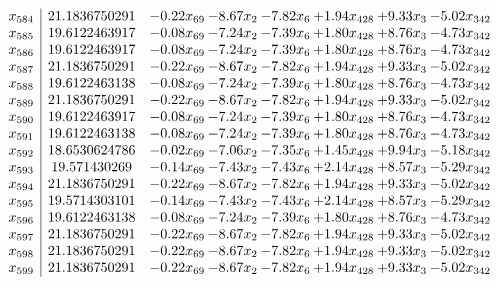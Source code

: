 \documentclass[8pt]{article}
\begin{document}
\[\begin{array}{c| c c@{\hskip 2pt} c@{\hskip 2pt} c@{\hskip 2pt} c@{\hskip 2pt} c@{\hskip 2pt} c@{\hskip 2pt} }
 x_{584}   &  21.1836750291 & -0.22 x_{69} & -8.67 x_{2} & -7.82 x_{6} & +  1.94 x_{428} & +  9.33 x_{3} & -5.02 x_{342}\\
 x_{585}   &  19.6122463917 & -0.08 x_{69} & -7.24 x_{2} & -7.39 x_{6} & +  1.80 x_{428} & +  8.76 x_{3} & -4.73 x_{342}\\
 x_{586}   &  19.6122463917 & -0.08 x_{69} & -7.24 x_{2} & -7.39 x_{6} & +  1.80 x_{428} & +  8.76 x_{3} & -4.73 x_{342}\\
 x_{587}   &  21.1836750291 & -0.22 x_{69} & -8.67 x_{2} & -7.82 x_{6} & +  1.94 x_{428} & +  9.33 x_{3} & -5.02 x_{342}\\
 x_{588}   &  19.6122463138 & -0.08 x_{69} & -7.24 x_{2} & -7.39 x_{6} & +  1.80 x_{428} & +  8.76 x_{3} & -4.73 x_{342}\\
 x_{589}   &  21.1836750291 & -0.22 x_{69} & -8.67 x_{2} & -7.82 x_{6} & +  1.94 x_{428} & +  9.33 x_{3} & -5.02 x_{342}\\
 x_{590}   &  19.6122463917 & -0.08 x_{69} & -7.24 x_{2} & -7.39 x_{6} & +  1.80 x_{428} & +  8.76 x_{3} & -4.73 x_{342}\\
 x_{591}   &  19.6122463138 & -0.08 x_{69} & -7.24 x_{2} & -7.39 x_{6} & +  1.80 x_{428} & +  8.76 x_{3} & -4.73 x_{342}\\
 x_{592}   &  18.6530624786 & -0.02 x_{69} & -7.06 x_{2} & -7.35 x_{6} & +  1.45 x_{428} & +  9.94 x_{3} & -5.18 x_{342}\\
 x_{593}   &  19.571430269 & -0.14 x_{69} & -7.43 x_{2} & -7.43 x_{6} & +  2.14 x_{428} & +  8.57 x_{3} & -5.29 x_{342}\\
 x_{594}   &  21.1836750291 & -0.22 x_{69} & -8.67 x_{2} & -7.82 x_{6} & +  1.94 x_{428} & +  9.33 x_{3} & -5.02 x_{342}\\
 x_{595}   &  19.5714303101 & -0.14 x_{69} & -7.43 x_{2} & -7.43 x_{6} & +  2.14 x_{428} & +  8.57 x_{3} & -5.29 x_{342}\\
 x_{596}   &  19.6122463138 & -0.08 x_{69} & -7.24 x_{2} & -7.39 x_{6} & +  1.80 x_{428} & +  8.76 x_{3} & -4.73 x_{342}\\
 x_{597}   &  21.1836750291 & -0.22 x_{69} & -8.67 x_{2} & -7.82 x_{6} & +  1.94 x_{428} & +  9.33 x_{3} & -5.02 x_{342}\\
 x_{598}   &  21.1836750291 & -0.22 x_{69} & -8.67 x_{2} & -7.82 x_{6} & +  1.94 x_{428} & +  9.33 x_{3} & -5.02 x_{342}\\
 x_{599}   &  21.1836750291 & -0.22 x_{69} & -8.67 x_{2} & -7.82 x_{6} & +  1.94 x_{428} & +  9.33 x_{3} & -5.02 x_{342}\\

\end{array}\]
\end{document}
